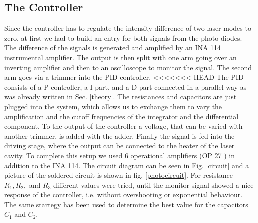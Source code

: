 \documentclass[a4paper,10pt]{article}
\begin{document}
\subsection{The Controller}
Since the controller has to regulate the intensity difference of two laser modes to zero, at first we had to build an entry for both signals from the photo diodes. The difference of the signals is generated and amplified by an INA 114 \cite{ina114} instrumental amplifier. The output is then split with one arm going over an inverting amplifier and then to an oscilloscope to monitor the signal. The second arm goes via a trimmer into the PID-controller.
\newline
<<<<<<< HEAD
The PID consists of a P-controller, a I-part, and a D-part connected in a parallel way as was already written in Sec. \ref{theory}. The resistances and capacitors are just plugged into the system, which allows us to exchange them to vary the amplification and the cutoff frequencies of the integrator and the differential component. To the output of the controller a  voltage, that can be varied with another trimmer, is added with the adder. Finally the signal is fed into the driving stage, where the output can be connected to the heater of the laser cavity. To complete this setup we used 6 operational amplifiers (OP 27 \cite{op27}) in addition to the INA 114. The circuit diagram can be seen in Fig. \ref{circuit} and a picture of the soldered circuit is shown in fig. \ref{photocircuit}.
For resistance $R_1,R_2,$ and $R_3$ different values were tried, until the monitor signal showed a nice response of the controller, i.e. without overshooting or exponential behaviour. The same startegy has been used to determine the best value for the capacitors $C_1$ and $C_2$.
\end{document}
